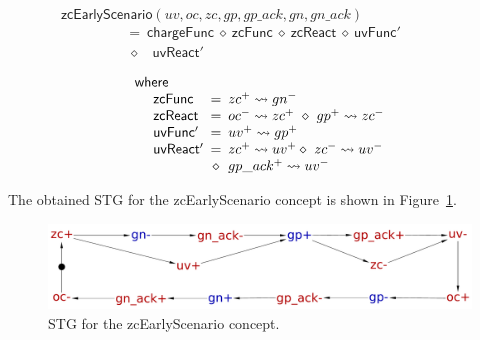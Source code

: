 \documentclass[british, journal]{IEEEtran}
\begin{document}
\vspace{-4mm}
\[
\mathsf{zcEarlyScenario}(uv,oc,zc,gp,gp\_ack,gn,gn\_ack)~~~~~~~~~~~~~~~~~~~~~~~~~~~~~~~
\]
\vspace{-5mm}
\[
\begin{array}{lcl}
~~=~\mathsf{chargeFunc}~\diamond~\mathsf{zcFunc}~\diamond~\mathsf{zcReact}~\diamond~\mathsf{uvFunc'}\\
~~~\!\diamond~~~~\!\!\mathsf{uvReact'}\\
\end{array}
\]
\vspace{-4mm}
\[
\begin{array}{lcl}
\mathsf{where}&~&\\

~~~~\mathsf{zcFunc}&\hspace{-2mm}=&\hspace{-2mm}zc^{+}\rightsquigarrow gn^{-}\\
~~~~\mathsf{zcReact}&\hspace{-2mm}=&\hspace{-2mm}oc^{-}\rightsquigarrow
zc^{+}~\diamond~gp^{+}\rightsquigarrow zc^{-}\\
~~~~\mathsf{uvFunc'}&\hspace{-2mm}=&\hspace{-2mm}uv^{+}\rightsquigarrow gp^{+}\\~~~~\mathsf{uvReact'}&\hspace{-2mm}=&\hspace{-2mm}zc^{+}\rightsquigarrow uv^{+}
\diamond~zc^{-}\rightsquigarrow uv^{-}\\
&\hspace{-2mm}\diamond&\hspace{-2mm}gp\_ack^{+}\rightsquigarrow uv^{-}

\end{array}
\]

The obtained STG for the \textsf{zcEarlyScenario} concept is shown
in Figure~\ref{fig:zcEarlyScenario STG}.

\begin{figure}[H]
\begin{centering}
\includegraphics[scale=0.23]{Images/stg-UV_after_ZC}
\par\end{centering}
\protect\caption{\label{fig:zcEarlyScenario STG}STG for the
\textsf{zcEarlyScenario} concept.}
\vspace{-3mm}
\end{figure}
\end{document}
